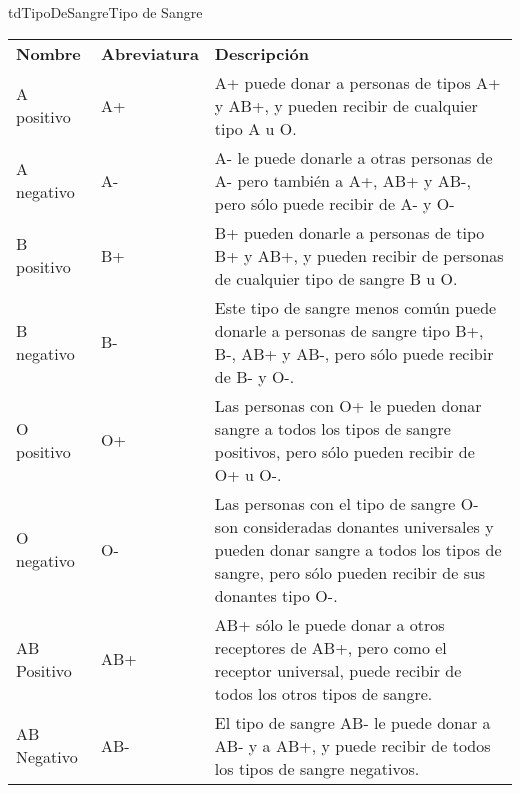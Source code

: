 \begin{TipoDeDato}{tdTipoDeSangre}{Tipo de Sangre}
		\begin{longtable}{| p{}| p{}|p{}|}
	 			\rowcolor{colorPrincipal}
	 			\multicolumn{3}{|c|}{\bf \color{white} Valores Iniciales}\\
	 			\hline
	 			\rowcolor{colorSecundario}
	 			\bf \color{white} Nombre & \bf \color{white} Abreviatura &  \bf \color{white} Descripción\\
	 			\hline
	 			 A positivo & A+ & A+ puede donar a personas de tipos A+ y AB+, y pueden recibir de cualquier tipo A u O.\\\hline
	 			 A negativo & A- & A- le puede donarle a otras personas de A- pero también a A+, AB+ y AB-, pero sólo puede recibir de A- y O-\\\hline
	 			 B positivo & B+ & B+ pueden donarle a  personas de tipo B+ y AB+, y pueden recibir de personas de cualquier tipo de sangre B u O.\\\hline
	 			 B negativo & B- & Este tipo de sangre menos común puede donarle a personas de sangre tipo B+, B-, AB+ y AB-, pero sólo puede recibir de B- y O-.\\\hline
	 			 O positivo & O+  & Las personas con O+ le pueden donar sangre a todos los tipos de sangre positivos, pero sólo pueden recibir de O+ u O-.\\\hline
	 			 O negativo & O- & Las personas con el tipo de sangre O- son consideradas donantes universales y pueden donar sangre a todos los tipos de sangre, pero sólo pueden recibir de sus donantes tipo O-. \\\hline
	 			 AB Positivo & AB+ & AB+ sólo le puede donar a otros receptores de AB+, pero como el  receptor universal, puede recibir de todos los otros tipos de sangre.\\\hline
	 			 AB Negativo & AB- & El tipo de sangre AB- le puede donar a AB- y a AB+, y puede recibir de todos los tipos de sangre negativos. \\
	 			\hline
	 		\end{longtable}
\end{TipoDeDato}


